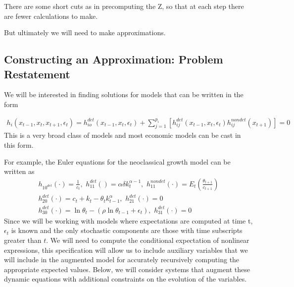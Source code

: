 \documentclass[12pt]{article}
\begin{document}
There are some short cuts as in precomputing the Z, so that at each step there are fewer calculations to make.  

But ultimately we will  need to make approximations.



\subsection{Constructing an Approximation: Problem Restatement}
\label{sec:constr-an-appr}



We will be interested in finding solutions for models that can be written in  the form


\begin{gather}
  h_i(x_{t-1},x_{t},x_{t+1},\epsilon_t)=h^{det}_{io}(x_{t-1},x_{t},\epsilon_t)+\sum_{j=1}^{p_i} [h^{det}_{ij}(x_{t-1},x_{t},\epsilon_t)h^{nondet}_{ij}(x_{t+1})]=0
\end{gather}
This is a very broad class of models and most economic models can 
be cast in this form.  

For example, the Euler equations for the  neoclassical growth  model 
\label{sec:simple-rbc-model-ext} can be written as
\begin{gather}
h_{10^{det}}(\cdot)=\frac{1}{c_t},\,\,
h_{11}^{det}()=\alpha \delta k_{t}^{\alpha-1} ,\,\,
h_{11}^{nondet}(\cdot)=E_t \left (\frac{\theta_{t+1}}{c_{t+1}} \right )\\
h_{20}^{det}(\cdot)=c_t + k_t-\theta_tk_{t-1}^\alpha,\,\,
h_{21}^{det}(\cdot)=0\\
h_{30}^{det}(\cdot)=\ln \theta_t -(\rho \ln \theta_{t-1} + \epsilon_t),\,\,
h_{31}^{det}(\cdot)=0
\end{gather}
Since we will be working with models where expectations are computed at time t, $\epsilon_t$ is known and the only stochastic components are those with time subscripts greater than $t$. We will need to compute 
the conditional expectation of nonlinear expressions,  
this specification will allow us to include auxiliary
variables that we will include in the augmented model for 
accurately recursively computing  the appropriate expected values.
Below, we will consider 
systems that augment these dynamic equations with additional constraints 
on the evolution of the variables.
\end{document}
